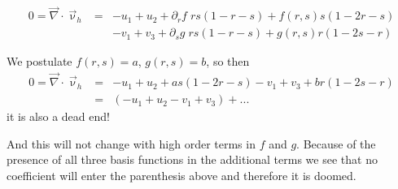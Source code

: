 \begin{eqnarray}
0=\vec\nabla\cdot\vec\upnu_h 
&=& 
  -u_1+u_2 + \partial_r f \; rs(1-r-s) + f(r,s)s(1-2r-s) \\
&&-v_1+v_3 + \partial_s g \; rs(1-r-s) + g(r,s)r(1-2s-r)
\end{eqnarray}


We postulate $f(r,s)=a$, $g(r,s)=b$, so then 
\begin{eqnarray}
0=\vec\nabla\cdot\vec\upnu_h 
&=&   -u_1+u_2 +  as(1-2r-s) -v_1+v_3 +  br(1-2s-r) \\
&=&  (-u_1+u_2 -v_1+v_3) + ...
\end{eqnarray}
it is also a dead end!

And this will not change with high order terms in $f$ and $g$. Because of the presence of all three 
basis functions in the additional terms we see that no 
coefficient will enter the parenthesis above and therefore it is doomed. 














